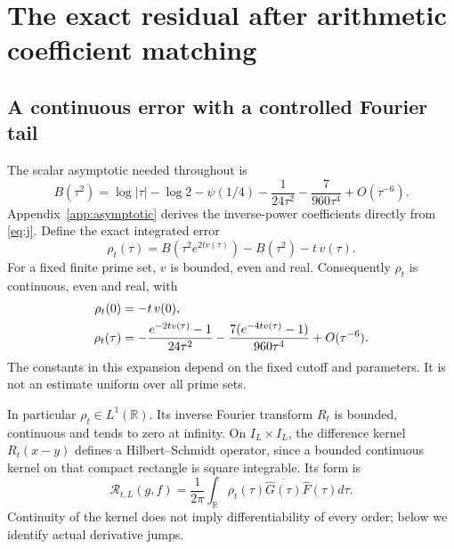 \documentclass[11pt]{article}
\numberwithin{equation}{section}
\theoremstyle{definition}
\theoremstyle{remark}
\newcommand{\R}{\mathbb R}
\begin{document}
\section{The exact residual after arithmetic coefficient matching}
\label{sec:residual}
\subsection{A continuous error with a controlled Fourier tail}
The scalar asymptotic needed throughout is
\begin{equation}
 B(\tau^2)=\log|\tau|-\log2-\psi(1/4)
 -\frac1{24\tau^2}-\frac7{960\tau^4}+O(\tau^{-6}).
 \label{eq:Basymp}
\end{equation}
Appendix~\ref{app:asymptotic} derives the inverse-power coefficients directly from \eqref{eq:j}. Define the exact integrated error
\begin{equation}
 \rho_t(\tau)=B(\tau^2e^{2tv(\tau)})-B(\tau^2)-t\,v(\tau).
 \label{eq:rho}
\end{equation}
For a fixed finite prime set, $v$ is bounded, even and real. Consequently $\rho_t$ is continuous, even and real, with
\begin{align}
 \rho_t(0)&=-t\,v(0),\notag\\
 \rho_t(\tau)&=-\frac{e^{-2tv(\tau)}-1}{24\tau^2}
 -\frac{7(e^{-4tv(\tau)}-1)}{960\tau^4}+O(\tau^{-6}).
 \label{eq:rhotail}
\end{align}
The constants in this expansion depend on the fixed cutoff and parameters. It is not an estimate uniform over all prime sets.

In particular $\rho_t\in L^1(\R)$. Its inverse Fourier transform $R_t$ is bounded, continuous and tends to zero at infinity. On $I_L\times I_L$, the difference kernel $R_t(x-y)$ defines a Hilbert--Schmidt operator, since a bounded continuous kernel on that compact rectangle is square integrable. Its form is
\begin{equation}
 \mathscr R_{t,L}(g,f)=\frac1{2\pi}\int_\R\rho_t(\tau)
 \overline{\widehat G(\tau)}\widehat F(\tau)d\tau.
\end{equation}
Continuity of the kernel does not imply differentiability of every order; below we identify actual derivative jumps.
\end{document}
